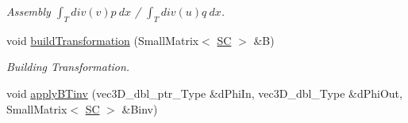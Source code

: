 \begin{DoxyCompactItemize}
\begin{DoxyCompactList}\small\item\em Assembly $ \int_T div(v) p ~dx$ / $ \int_T div(u) q ~dx$. \end{DoxyCompactList}\item 
void \hyperlink{classFEDD_1_1AssembleFEAceNavierStokes_a53800a9619bf9e254f1fb4bd38f1a4af}{build\+Transformation} (Small\+Matrix$<$ \hyperlink{fe__test__laplace_8cpp_a79c7e86a57edbb2a5a53242bcd04e41e}{SC} $>$ \&B)
\begin{DoxyCompactList}\small\item\em Building Transformation. \end{DoxyCompactList}\item 
void \hyperlink{classFEDD_1_1AssembleFEAceNavierStokes_a21245b4e7d008c8f1cc28e6dad2873c1}{apply\+B\+Tinv} (vec3\+D\+\_\+dbl\+\_\+ptr\+\_\+\+Type \&d\+Phi\+In, vec3\+D\+\_\+dbl\+\_\+\+Type \&d\+Phi\+Out, Small\+Matrix$<$ \hyperlink{fe__test__laplace_8cpp_a79c7e86a57edbb2a5a53242bcd04e41e}{SC} $>$ \&Binv)
\end{DoxyCompactItemize}
